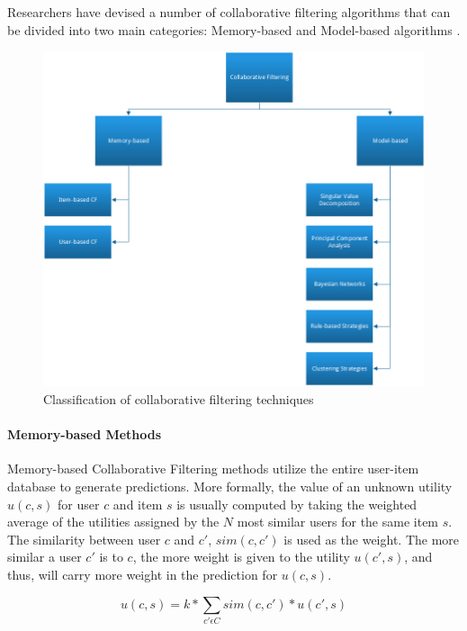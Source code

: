 Researchers have devised a number of collaborative filtering algorithms that
can be divided into two main categories: Memory-based and Model-based
algorithms \cite{Su2009}.\linebreak[4]

\begin{figure}[H]
    \includegraphics[width=5in]{image/cftaxonomy.png}
    \centering
    \caption[Classification of collaborative filtering techniques]{Classification of collaborative filtering techniques}
    \label{figure:cftaxonomy}
\end{figure}

\paragraph{Memory-based Methods}

Memory-based Collaborative Filtering methods utilize the entire user-item
database to generate predictions. More formally, the value of an unknown
utility $u(c,s)$ for user $c$ and item $s$ is usually computed by taking the
weighted average of the utilities assigned by the $N$ most similar users for
the same item $s$. The similarity between user $c$ and $c'$, $sim(c, c')$ is
used as the weight. The more similar a user $c'$ is to $c$, the more weight is
given to the utility $u(c', s)$, and thus, will carry more weight in the
prediction for $u(c,s)$.

\begin{equation}
\label{equation:cfratingprediction}
u(c,s) = k * \sum_{c' \epsilon C} sim(c, c') * u(c',s)
\end{equation}

